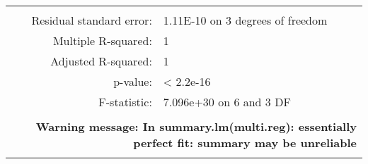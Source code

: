 \documentclass[12pt]{article}
\begin{document}
\begin{landscape}
\begin{table}[htbp]
\begin{tabular}{rrrrrrr}
    \midrule
         &      &      &      &      &      &  \\
    \multicolumn{2}{r}{Residual standard error: } & \multicolumn{5}{l}{1.11E-10 on 3 degrees of freedom} \\
    \multicolumn{2}{r}{Multiple R-squared: } & \multicolumn{1}{l}{1} & \multicolumn{2}{r}{} &      &  \\
    \multicolumn{2}{r}{Adjusted R-squared:} & \multicolumn{1}{l}{1} &      &      &      &  \\
    \multicolumn{2}{r}{p-value: } & \multicolumn{1}{l}{< 2.2e-16} &      &      &      &  \\
    \multicolumn{2}{r}{F-statistic: } & \multicolumn{5}{l}{7.096e+30 on 6 and 3 DF } \\
         &      &      &      &      &      &  \\
    \multicolumn{7}{r}{\textbf{Warning message: In summary.lm(multi.reg): essentially perfect fit: summary may be unreliable}} \\
         &      &      &      &      &      &  \\
    \hline
    \end{tabular}%
  \label{tab:tab11}%
\end{table}%
\end{landscape}
\end{document}
